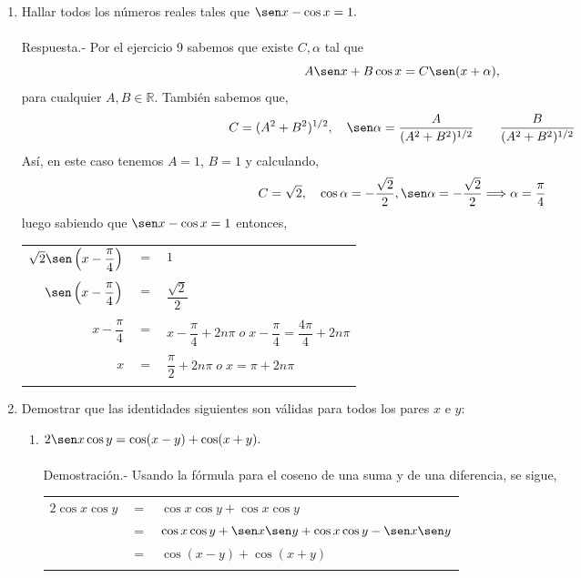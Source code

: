 \begin{enumerate}
\item Hallar todos los números reales tales que $\sen x - \cos x = 1.$\\\\
    Respuesta.-\; Por el ejercicio 9 sabemos que existe $C,\alpha$ tal que $$A\sen x +B\cos x = C\sen(x+\alpha),$$
    para cualquier $A,B \in \mathbb{R}$. También sabemos que,
    $$C= (A^2 + B^2)^{1/2}, \quad \sen \alpha = \dfrac{A}{(A^2+B^2)^{1/2}} \qquad \dfrac{B}{(A^2+B^2)^{1/2}}$$
    Así, en este caso tenemos $A=1$, $B=1$ y calculando,
    $$C=\sqrt{2}, \quad \cos \alpha = - \dfrac{\sqrt{2}}{2}, \sen \alpha = -\dfrac{\sqrt{2}}{2} \Longrightarrow \alpha = \dfrac{\pi}{4}$$
    luego sabiendo que $\sen x - \cos x = 1$ entonces,
    \begin{center}
	\begin{tabular}{rcl}
	    $\sqrt{2} \sen \left(x-\dfrac{\pi}{4}\right)$&$=$&$1$\\\\
	    $\sen\left(x-\dfrac{\pi}{4}\right)$&$=$&$\dfrac{\sqrt{2}}{2}$\\\\
	    $x-\dfrac{\pi}{4}$&$=$&$x-\dfrac{\pi}{4}+2n\pi \; o \; x-\dfrac{\pi}{4} = \dfrac{4\pi}{4}+2n\pi$\\\\
	    $x$&$=$&$\dfrac{\pi}{2}+2n\pi \; o \; x = \pi + 2n\pi$\\\\
	\end{tabular}
    \end{center}

\item Demostrar que las identidades siguientes son válidas para todos los pares $x$ e $y$:

    \begin{enumerate}[\bfseries (a)]

	\item $2\sen x \cos y = \cos(x-y) + \cos(x+y).$\\\\
	    Demostración.-\; Usando la fórmula para el coseno de una suma y de una diferencia, se sigue,\\
	    \begin{center}
		\begin{tabular}{rcl}
		    $2\cos x \cos y$&$=$&$\cos x \cos y + \cos x \cos y$\\
		    &$=$&$\cos x \cos y + \sen x \sen y + \cos x \cos y -\sen x \sen y$\\
		    &$=$&$\cos(x-y)+\cos(x+y)$\\\\
		\end{tabular}
	    \end{center}



\end{enumerate}
\end{enumerate}
